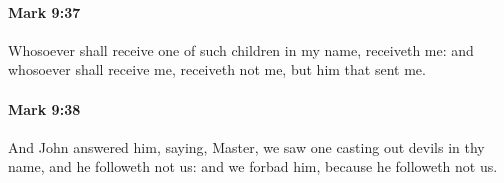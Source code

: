 		\paragraph{Mark 9:37} %
			\label{MARK-9-37}

			Whosoever shall receive one of such children in my name, receiveth me: and whosoever shall receive me, receiveth not me, but him that sent me.

			\begin{framed}
			\scriptsize
				\begin{compactdesc}
					\item[SBLG] 
				\end{compactdesc}
			\end{framed}

		\paragraph{Mark 9:38} %
			\label{MARK-9-38}

			And John answered him, saying, Master, we saw one casting out devils in thy name, and he followeth not us: and we forbad him, because he followeth not us.

